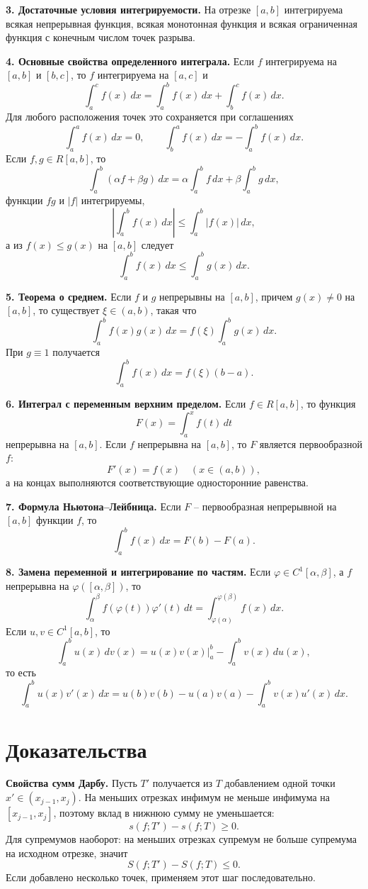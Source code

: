 \documentclass[12pt,a4paper]{article}
\newcommand{\dd}{\,d}
\begin{document}
\textbf{3. Достаточные условия интегрируемости.}
На отрезке \([a,b]\) интегрируема всякая непрерывная функция, всякая монотонная
функция и всякая ограниченная функция с конечным числом точек разрыва.

\textbf{4. Основные свойства определенного интеграла.}
Если \(f\) интегрируема на \([a,b]\) и \([b,c]\), то \(f\) интегрируема на
\([a,c]\) и
\[
  \int_a^c f(x)\dd x
  =
  \int_a^b f(x)\dd x+\int_b^c f(x)\dd x.
\]
Для любого расположения точек это сохраняется при соглашениях
\[
  \int_a^a f(x)\dd x=0,\qquad
  \int_b^a f(x)\dd x=-\int_a^b f(x)\dd x.
\]
Если \(f,g\in R[a,b]\), то
\[
  \int_a^b(\alpha f+\beta g)\dd x
  =
  \alpha\int_a^b f\dd x+\beta\int_a^b g\dd x,
\]
функции \(fg\) и \(|f|\) интегрируемы,
\[
  \left|\int_a^b f(x)\dd x\right|
  \le
  \int_a^b |f(x)|\dd x,
\]
а из \(f(x)\le g(x)\) на \([a,b]\) следует
\[
  \int_a^b f(x)\dd x\le\int_a^b g(x)\dd x.
\]

\textbf{5. Теорема о среднем.}
Если \(f\) и \(g\) непрерывны на \([a,b]\), причем \(g(x)\ne0\) на
\([a,b]\), то существует \(\xi\in(a,b)\), такая что
\[
  \int_a^b f(x)g(x)\dd x
  =
  f(\xi)\int_a^b g(x)\dd x.
\]
При \(g\equiv1\) получается
\[
  \int_a^b f(x)\dd x=f(\xi)(b-a).
\]

\textbf{6. Интеграл с переменным верхним пределом.}
Если \(f\in R[a,b]\), то функция
\[
  F(x)=\int_a^x f(t)\dd t
\]
непрерывна на \([a,b]\). Если \(f\) непрерывна на \([a,b]\), то \(F\) является
первообразной \(f\):
\[
  F'(x)=f(x)\quad (x\in(a,b)),
\]
а на концах выполняются соответствующие односторонние равенства.

\textbf{7. Формула Ньютона--Лейбница.}
Если \(F\) -- первообразная непрерывной на \([a,b]\) функции \(f\), то
\[
  \int_a^b f(x)\dd x=F(b)-F(a).
\]

\textbf{8. Замена переменной и интегрирование по частям.}
Если \(\varphi\in C^1[\alpha,\beta]\), а \(f\) непрерывна на
\(\varphi([\alpha,\beta])\), то
\[
  \int_\alpha^\beta f(\varphi(t))\varphi'(t)\dd t
  =
  \int_{\varphi(\alpha)}^{\varphi(\beta)} f(x)\dd x.
\]
Если \(u,v\in C^1[a,b]\), то
\[
  \int_a^b u(x)\dd v(x)
  =
  u(x)v(x)\Big|_a^b-\int_a^b v(x)\dd u(x),
\]
то есть
\[
  \int_a^b u(x)v'(x)\dd x
  =
  u(b)v(b)-u(a)v(a)-\int_a^b v(x)u'(x)\dd x.
\]

\section*{Доказательства}

\textbf{Свойства сумм Дарбу.}
Пусть \(T'\) получается из \(T\) добавлением одной точки \(x'\in(x_{j-1},x_j)\).
На меньших отрезках инфимум не меньше инфимума на \([x_{j-1},x_j]\), поэтому
вклад в нижнюю сумму не уменьшается:
\[
  s(f;T')-s(f;T)\ge0.
\]
Для супремумов наоборот: на меньших отрезках супремум не больше супремума на
исходном отрезке, значит
\[
  S(f;T')-S(f;T)\le0.
\]
Если добавлено несколько точек, применяем этот шаг последовательно.
\end{document}
